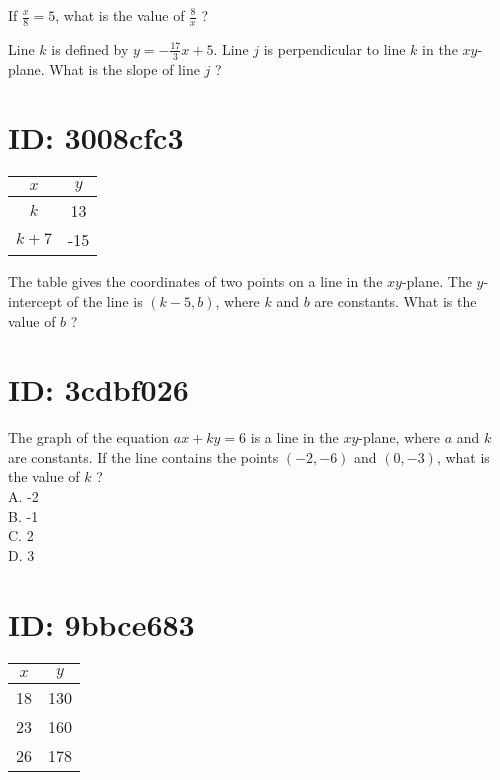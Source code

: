 If $\frac{x}{8}=5$, what is the value of $\frac{8}{x}$ ?






Line $k$ is defined by $y=-\frac{17}{3} x+5$. Line $j$ is 
perpendicular to line $k$ in the $x y$-plane. What is the slope of line $j$ ?








\section*{ID: 3008cfc3}
\begin{center}
\begin{tabular}{|c|c|}
\hline
$x$ & $y$ \\
\hline
$k$ & 13 \\
\hline
$k+7$ & -15 \\
\hline
\end{tabular}
\end{center}

The table gives the coordinates of two points on 
a line in the $x y$-plane. The $y$-intercept of the 
line is $(k-5, b)$, where $k$ and $b$ are constants. 
What is the value of $b$ ?










\section*{ID: 3cdbf026}
The graph of the equation $a x+k y=6$ is a line in the $x y$-plane, where $a$ and $k$ are constants. If the line contains the points $(-2,-6)$ and $(0,-3)$, what is the value of $k$ ?\\
A. -2\\
B. -1\\
C. 2\\
D. 3











\section*{ID: 9bbce683}
\begin{center}
\begin{tabular}{|c|c|}
\hline
$x$ & $y$ \\
\hline
18 & 130 \\
\hline
23 & 160 \\
\hline
26 & 178 \\
\hline
\end{tabular}
\end{center}

